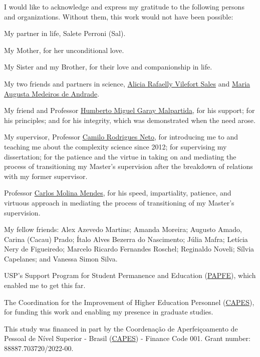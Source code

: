 \begin{agradecimentos}[\agradecimentosname]

I would like to acknowledge and express my gratitude to the following
persons and organizations. Without them, this work would not have been
possible:

\smallskip

My partner in life, Salete Perroni (Sal).

My Mother, for her unconditional love.

My Sister and my Brother, for their love and companionship in life.

My two friends and partners in science,
\href{https://orcid.org/0000-0003-0004-4487}{Alicia Rafaelly Vilefort
Sales} and \href{https://orcid.org/0000-0002-9283-9967}{Maria Augusta
Medeiros de Andrade}.

My friend and Professor
\href{https://orcid.org/0000-0002-1164-2055}{Humberto Miguel Garay
Malpartida}, for his support; for his principles; and for his integrity,
which was demonstrated when the need arose.

My supervisor, Professor
\href{https://orcid.org/0000-0001-6783-6695}{Camilo Rodrigues Neto}, for
introducing me to and teaching me about the complexity science since
2012; for supervising my dissertation; for the patience and the virtue
in taking on and mediating the process of transitioning my Master's
supervision after the breakdown of relations with my former supervisor.

Professor \href{https://orcid.org/0000-0003-2916-4415}{Carlos Molina
Mendes}, for his speed, impartiality, patience, and virtuous approach in
mediating the process of transitioning of my Master's supervision.

My fellow friends: Alex Azevedo Martins; Amanda Moreira; Augusto Amado,
Carina (Cacau) Prado; Ítalo Alves Bezerra do Nascimento; Júlia Mafra;
Letícia Nery de Figueiredo; Marcelo Ricardo Fernandes Roschel; Reginaldo
Noveli; Sílvia Capelanes; and Vanessa Simon Silva.

USP's Support Program for Student Permanence and Education
(\href{https://prip.usp.br/apoio-estudantil/}{PAPFE}), which enabled me
to get this far.

The Coordination for the Improvement of Higher Education Personnel
(\href{https://www.gov.br/capes/}{CAPES}), for funding this work and
enabling my presence in graduate studies.

\smallskip
\begingroup
\renewcommand{\baselinestretch}{1}

\noindent This study was financed in part by the Coordenação de
Aperfeiçoamento de Pessoal de Nível Superior - Brasil
(\href{https://www.gov.br/capes/}{CAPES}) - Finance Code 001. Grant
number: 88887.703720/2022-00.

\endgroup

\end{agradecimentos}

